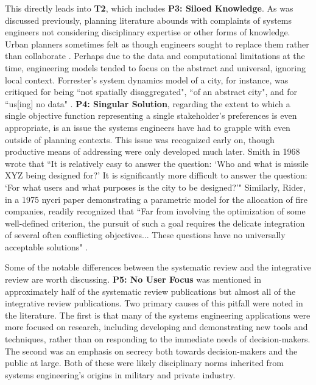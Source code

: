 This directly leads into \textbf{T2}, which includes \textbf{P3: Siloed Knowledge}. As was discussed previously, planning literature abounds with complaints of systems engineers not considering disciplinary expertise or other forms of knowledge. Urban planners sometimes felt as though engineers sought to replace them rather than collaborate \cite{lightWarfareWelfareDefense2005}. Perhaps due to the data and computational limitations at the time, engineering models tended to focus on the abstract and universal, ignoring local context. Forrester's system dynamics model of a city, for instance, was critiqued for being ``not spatially disaggregated", ``of an abstract city", and for ``us[ing] no data" \cite[\textsuperscript{(p174)}]{leejrRequiemLargeScaleModels1973}. \textbf{P4: Singular Solution}, regarding the extent to which a single objective function representing a single stakeholder's preferences is even appropriate, is an issue the systems engineers have had to grapple with even outside of planning contexts. This issue was recognized early on, though productive means of addressing were only developed much later. Smith in 1968 wrote that ``It is relatively easy to answer the question: `Who and what is missile XYZ being designed for?' It is significantly more difficult to answer the question: `For what users and what purposes is the city to be designed?'" \cite[\textsuperscript{(p34)}]{smithSystemsApproachUrban1968} Similarly, Rider, in a 1975 \ac{nycri} paper demonstrating a parametric model for the allocation of fire companies, readily recognized that ``Far from involving the optimization of some well-defined criterion, the pursuit of such a goal requires the delicate integration of several often conflicting objectives... These questions have no universally acceptable solutions" \cite[\textsuperscript{(p146-147)}]{riderParametricModelAllocation1975}.

Some of the notable differences between the systematic review and the integrative review are worth discussing. \textbf{P5: No User Focus} was mentioned in approximately half of the systematic review publications but almost all of the integrative review publications. Two primary causes of this pitfall were noted in the literature. The first is that many of the systems engineering applications were more focused on research, including developing and demonstrating new tools and techniques, rather than on responding to the immediate needs of decision-makers. The second was an emphasis on secrecy both towards decision-makers and the public at large. Both of these were likely disciplinary norms inherited from systems engineering's origins in military and private industry.

